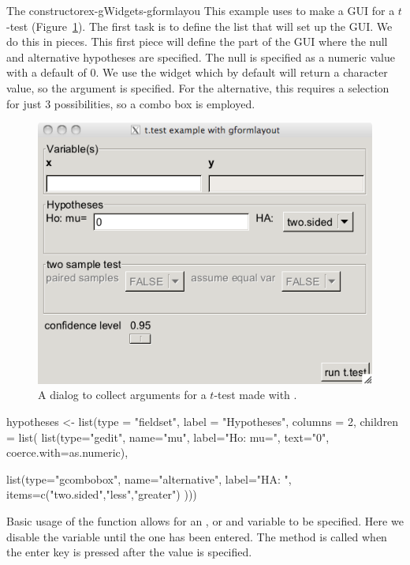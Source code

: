 \begin{example}{The  constructor}{ex-gWidgets-gformlayou}
This example uses  to make a GUI for a $t$-test (Figure~\ref{fig:ex-gWidgets-formlayout}). The
first task is to define the list that will set up the GUI. We do this
in pieces. This first piece will define the part of the GUI where the
null and alternative hypotheses are specified. The null is specified
as a numeric value with a default of 0. We use the  widget
which by default will return a character value, so the
 argument is specified. For the alternative, this
requires a selection for just 3 possibilities, so a combo box is
employed.
\begin{figure}
  \centering
  \includegraphics[width=.5\textwidth]{ex-gWidgets-formlayout}
  \caption{A dialog to collect arguments for a $t$-test made with .}
  \label{fig:ex-gWidgets-formlayout}
\end{figure}


\begin{Schunk}
\begin{Sinput}
 hypotheses <- 
   list(type = "fieldset",
        label = "Hypotheses",
        columns = 2, 
        children = list(
          list(type="gedit",                            
               name="mu", label="Ho: mu=",
               text="0", coerce.with=as.numeric),
          
          list(type="gcombobox",
               name="alternative", label="HA: ",
               items=c("two.sided","less","greater")
               )))
\end{Sinput}
\end{Schunk}

Basic usage of the  function allows for an , or
 and  variable to be specified. Here we disable the
 variable until the  one has been entered. The
 method is called when the enter key is
pressed after the  value is specified.


\end{example}
